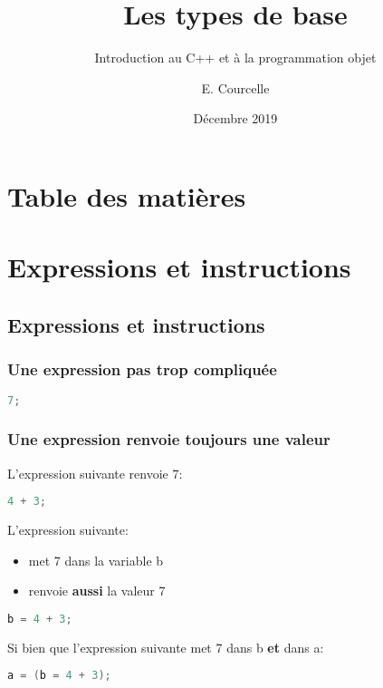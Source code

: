 \documentclass{beamer}
\title{Les types de base}
\subtitle{Introduction au C++ et à la programmation objet}
\author{E. Courcelle}\institute{CALMIP, UMS 3669}
\date{Décembre 2019}
\begin{document}
\begin{frame}
\titlepage
\end{frame}

\section*{Table des matières}
\begin{frame}
\tableofcontents
\end{frame}


\section{Expressions et instructions}

\subsection{Expressions et instructions}

\begin{frame}[fragile=singleslide,shrink=20]
\frametitle {Une expression pas trop compliquée}
\begin{lstlisting}[language=c++]
7;
\end{lstlisting}
\end{frame}

\begin{frame}[fragile=singleslide,shrink=20]
\frametitle {Une expression renvoie toujours une valeur}
L'expression suivante renvoie 7:
\begin{lstlisting}[language=c++]
4 + 3;
\end{lstlisting}

L'expression suivante:
\begin{itemize}
\item{met 7 dans la variable b}
\item{renvoie \textbf{aussi} la valeur 7}
\end{itemize}
\begin{lstlisting}[language=c++]
b = 4 + 3;
\end{lstlisting}

Si bien que l'expression suivante met 7 dans b \textbf{et} dans a:
\begin{lstlisting}[language=c++]
a = (b = 4 + 3);
\end{lstlisting}
\end{frame}
\end{document}
